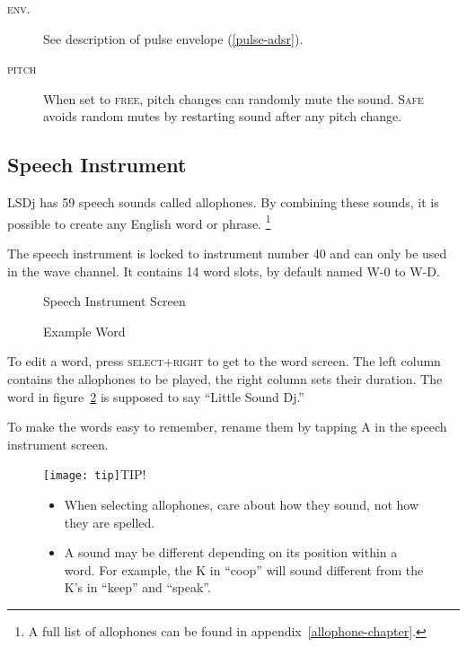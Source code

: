 \begin{description}
	\item[\textsc{env.}] See description of pulse envelope (\ref{pulse-adsr}).
	\item[\textsc{pitch}] When set to \textsc{free}, pitch changes can randomly mute the sound. \textsc{Safe} avoids random mutes by restarting sound after any pitch change.
\end{description}

\subsection{Speech Instrument}

LSDj has 59 speech sounds called allophones. By combining these sounds, it is possible to create any English word or phrase.
\footnote{A full list of allophones can be found in appendix~\ref{allophone-chapter}.}

The speech instrument is locked to instrument number 40 and can only be used in the wave channel. It contains 14 word slots, by default named W-0 to W-D.

\begin{figure}[htpb]
	\begin{center}
	\end{center}
	\caption{Speech Instrument Screen}
	\label{fig:speech}
\end{figure}
\begin{figure}[htpb]
	\begin{center}
	\end{center}
	\caption{Example Word}
	\label{fig:word}
\end{figure}

To edit a word, press \textsc{select+right} to get to the word screen. The left column contains the allophones to be played, the right column sets their duration. The word in figure~\ref{fig:word} is supposed to say ``Little Sound Dj.''

To make the words easy to remember, rename them by tapping A in the speech instrument screen.

\begin{figure}[hbtp]
	\texttt{[image: tip]}TIP!
	\begin{itemize}
		\item When selecting allophones, care about how they sound, not how they are spelled.
		\item A sound may be different depending on its position within a word. For example, the K in ``coop'' will sound different from the K's in ``keep'' and ``speak''.
	\end{itemize}
\end{figure}

